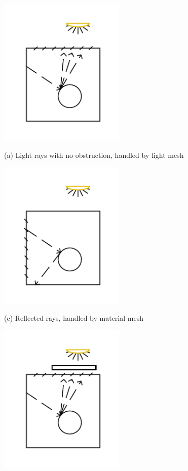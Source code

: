\begin{figure}[!htb]
  \includegraphics[width=6cm]{drawings/Case_1.pdf}
  
  (a) Light rays with no obstruction, handled by light mesh
  
  \includegraphics[width=6cm]{drawings/Case_3.pdf}
  
  (c) Reflected rays, handled by material mesh
  
\endminipage\hfill
{}
  \includegraphics[width=6cm]{drawings/Case_2.pdf}
  

\end{figure}
